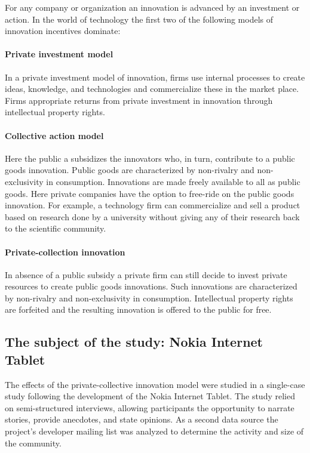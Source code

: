 \documentclass[a4paper]{scrartcl}
\begin{document}
For any company or organization an innovation is advanced by an investment or action.
In the world of technology the first two of the following models of innovation incentives dominate:

\paragraph{Private investment model}
In a private investment model of innovation, firms use internal processes to create ideas,
knowledge, and technologies and commercialize these in the market place. Firms appropriate
returns from private investment in innovation through intellectual property rights. 

\paragraph{Collective action model}
Here the public a subsidizes the innovators who, in turn, contribute to a public goods innovation.
Public goods are characterized by non-rivalry and non-exclusivity in consumption.
Innovations are made freely available to all as public goods.
Here private companies have the option to free-ride on the public goods innovation.
For example, a technology firm can commercialize and sell a product based on research done by a university without giving any of their research back to the scientific community. 

\paragraph{Private-collection innovation}
In absence of a public subsidy a private firm can still decide to invest private resources to create public goods innovations. 
Such innovations are characterized by non-rivalry and non-exclusivity
in consumption.
Intellectual property rights are forfeited and the resulting innovation is offered to
the public for free.


\subsection{The subject of the study: Nokia Internet Tablet}

The effects of the private-collective innovation model were studied in a single-case study following the development of the Nokia Internet Tablet.
The study relied on semi-structured interviews, allowing participants the opportunity
to narrate stories, provide anecdotes, and state opinions.
As a second data source the project's developer mailing list was analyzed to determine the activity and size of the community.
\end{document}
